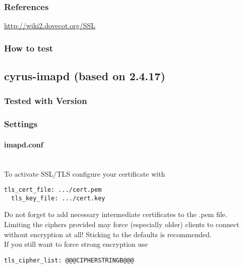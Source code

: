 \subsubsection{References} \url{http://wiki2.dovecot.org/SSL}


\subsubsection{How to test}




\subsection{cyrus-imapd (based on 2.4.17)}

\subsubsection{Tested with Version} 

\subsubsection{Settings}
\paragraph*{imapd.conf}\mbox{}\\

To activate SSL/TLS configure your certificate with
\begin{lstlisting}[breaklines]
  tls_cert_file: .../cert.pem
  tls_key_file: .../cert.key
\end{lstlisting}

Do not forget to add necessary intermediate certificates to the .pem file.\\

Limiting the ciphers provided may force (especially older) clients to connect without encryption at all! Sticking to the defaults is recommended.\\

If you still want to force strong encryption use
\begin{lstlisting}[breaklines]
  tls_cipher_list: @@@CIPHERSTRINGB@@@
\end{lstlisting}


